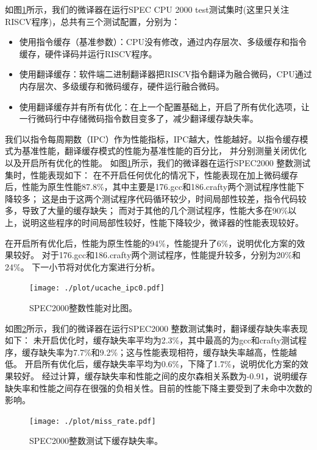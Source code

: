 如图\ref{img:ipc}所示，我们的微译器在运行SPEC CPU 2000 test测试集时(这里只关注RISCV程序)，总共有三个测试配置，分别为：
\begin{itemize}
  \item 使用指令缓存（基准参数）：CPU没有修改，通过内存层次、多级缓存和指令缓存，硬件译码并运行RISCV程序。
  \item 使用翻译缓存：软件端二进制翻译器把RISCV指令翻译为融合微码，CPU通过内存层次、多级缓存和微码缓存，硬件运行融合微码。
  \item 使用翻译缓存并有所有优化：在上一个配置基础上，开启了所有优化选项，让一行微码行中存储微码指令数目变多了，减少翻译缓存缺失率。
\end{itemize}

我们以指令每周期数（IPC）作为性能指标，IPC越大，性能越好。以指令缓存模式为基准性能，翻译缓存模式的性能为基准性能的百分比，
并分别测量关闭优化以及开启所有优化的性能。
如图\ref{img:ipc}所示，我们的微译器在运行SPEC2000 整数测试集时，性能表现如下：
在不开启任何优化的情况下，性能表现在加上微码缓存后，性能为原生性能87.8\%，其中主要是176.gcc和186.crafty两个测试程序性能下降较多；
这是由于这两个测试程序代码循环较少，时间局部性较差，指令代码较多，导致了大量的缓存缺失；
而对于其他的几个测试程序，性能大多在90\%以上，说明这些程序的时间局部性较好，性能下降较少，微译器的性能表现较好。

在开启所有优化后，性能为原生性能的94\%，性能提升了6\%，说明优化方案的效果较好。
对于176.gcc和186.crafty两个测试程序，性能提升较多，分别为20\%和24\%。
下一小节将对优化方案进行分析。


\begin{figure}[!htbp]
  \centering
  \texttt{[image: ./plot/ucache\_ipc0.pdf]}
  \caption{SPEC2000整数性能对比图。}
  \label{img:ipc}
\end{figure}

如图\ref{img:miss_rate}所示，我们的微译器在运行SPEC2000 整数测试集时，翻译缓存缺失率表现如下：
未开启优化时，缓存缺失率平均为2.3\%，其中最高的为gcc和crafty测试程序，缓存缺失率为7.7\%和9.2\%；这与性能表现相符，缓存缺失率越高，性能越低。
开启所有优化后，缓存缺失率平均为0.6\%，下降了1.7\%，说明优化方案的效果较好。
经过计算，缓存缺失率和性能之间的皮尔森相关系数为-0.91，说明缓存缺失率和性能之间存在很强的负相关性。目前的性能下降主要受到了未命中次数的影响。

\begin{figure}[!htbp]
  \centering
  \texttt{[image: ./plot/miss\_rate.pdf]}
  \caption{SPEC2000整数测试下缓存缺失率。}
  \label{img:miss_rate}
\end{figure}

